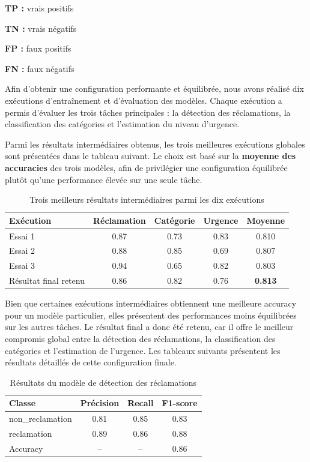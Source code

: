 \documentclass[12pt,a4paper,oneside]{report}
\begin{document}
\textbf{TP :} vrais positifs

\textbf{TN :} vrais négatifs

\textbf{FP :} faux positifs

\textbf{FN :} faux négatifs
\vspace{4.0mm}

Afin d'obtenir une configuration performante et équilibrée, nous avons réalisé dix exécutions d'entraînement et d'évaluation des modèles. Chaque exécution a permis d'évaluer les trois tâches principales : la détection des réclamations, la classification des catégories et l'estimation du niveau d'urgence.

Parmi les résultats intermédiaires obtenus, les trois meilleures exécutions globales sont présentées dans le tableau suivant. Le choix est basé sur la \textbf{moyenne des accuracies} des trois modèles, afin de privilégier une configuration équilibrée plutôt qu'une performance élevée sur une seule tâche.

\begin{table}[H]
\centering
\caption{Trois meilleurs résultats intermédiaires parmi les dix exécutions}
\begin{tabular}{|l|c|c|c|c|}
\hline
Exécution & Réclamation & Catégorie & Urgence & Moyenne \\
\hline
Essai 1 & 0.87 & 0.73 & 0.83 & 0.810 \\
Essai 2 & 0.88 & 0.85 & 0.69 & 0.807 \\
Essai 3 & 0.94 & 0.65 & 0.82 & 0.803 \\
\hline
Résultat final retenu & 0.86 & 0.82 & 0.76 & \textbf{0.813} \\
\hline
\end{tabular}
\end{table}
\clearpage

Bien que certaines exécutions intermédiaires obtiennent une meilleure accuracy pour un modèle particulier, elles présentent des performances moins équilibrées sur les autres tâches. Le résultat final a donc été retenu, car il offre le meilleur compromis global entre la détection des réclamations, la classification des catégories et l'estimation de l'urgence. Les tableaux suivants présentent les résultats détaillés de cette configuration finale.

\begin{table}[H]
\centering
\caption{Résultats du modèle de détection des réclamations}
\begin{tabular}{|l|c|c|c|}
\hline
Classe & Précision & Recall & F1-score \\
\hline
non\_reclamation & 0.81 & 0.85 & 0.83 \\
reclamation & 0.89 & 0.86 & 0.88 \\
\hline
Accuracy & -- & -- & 0.86 \\
\hline
\end{tabular}
\end{table}
\end{document}
